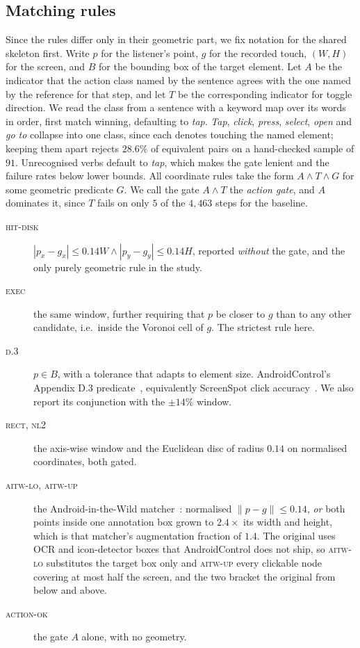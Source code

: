 \documentclass[runningheads,a4paper]{llncs}
\newcommand{\rulename}[1]{\textsc{#1}}
\begin{document}
\subsection{Matching rules}
Since the rules differ only in their geometric part, we fix notation for the shared skeleton
first. Write $p$ for the listener's point, $g$ for the recorded touch, $(W,H)$ for the screen, and $B$
for the bounding box of the target element. Let $A$ be the indicator that the action class named
by the sentence agrees with the one named by the reference for that step, and let $T$ be the
corresponding indicator for toggle direction. We read the class from a sentence with a keyword
map over its words in order, first match winning, defaulting to \emph{tap}. \emph{Tap},
\emph{click}, \emph{press}, \emph{select}, \emph{open} and \emph{go to} collapse into one class,
since each denotes touching the named element; keeping them apart rejects $28.6\%$ of equivalent
pairs on a hand-checked sample of $91$. Unrecognised verbs default to \emph{tap}, which makes the
gate lenient and the failure rates below lower bounds. All coordinate rules take the form $A \wedge T \wedge G$ for some geometric
predicate $G$. We call the gate $A \wedge T$ the \emph{action gate}, and $A$ dominates it, since
$T$ fails on only $5$ of the $4{,}463$ steps for the baseline.

\begin{description}
\item[\rulename{hit-disk}] $|p_x - g_x| \leq 0.14W \wedge |p_y - g_y| \leq 0.14H$, reported
\emph{without} the gate, and the only purely geometric rule in the study.
\item[\rulename{exec}] the same window, further requiring that $p$ be closer to $g$ than to any
other candidate, i.e.\ inside the Voronoi cell of $g$. The strictest rule here.
\item[\rulename{d.3}] $p \in B$, with a tolerance that adapts to element size. AndroidControl's
Appendix D.3 predicate~\cite{androidcontrol}, equivalently ScreenSpot click
accuracy~\cite{seeclick}. We also report its conjunction with the $\pm14\%$ window.
\item[\rulename{rect}, \rulename{nl2}] the axis-wise window and the Euclidean disc of radius
$0.14$ on normalised coordinates, both gated.
\item[\rulename{aitw-lo}, \rulename{aitw-up}] the Android-in-the-Wild matcher~\cite{aitw}:
normalised $\lVert p - g\rVert \leq 0.14$, \emph{or} both points inside one annotation box grown
to $2.4\times$ its width and height, which is that matcher's augmentation fraction of $1.4$. The original uses OCR and icon-detector boxes that
AndroidControl does not ship, so \rulename{aitw-lo} substitutes the target box only and
\rulename{aitw-up} every clickable node covering at most half the screen, and the two bracket
the original from below and above.
\item[\rulename{action-ok}] the gate $A$ alone, with no geometry.
\end{description}
\end{document}
